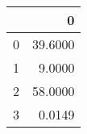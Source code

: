 \begin{tabular}{lr}
\toprule
{} &        0 \\
\midrule
0 &  39.6000 \\
1 &   9.0000 \\
2 &  58.0000 \\
3 &   0.0149 \\
\bottomrule
\end{tabular}
